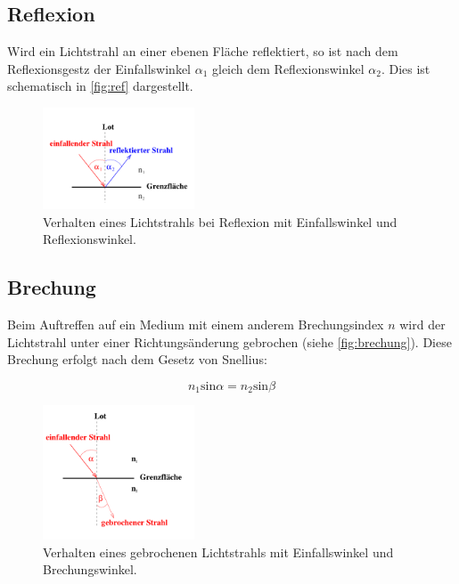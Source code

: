     \subsection{Reflexion}

        \noindent Wird ein Lichtstrahl an einer ebenen Fläche reflektiert, so ist nach dem Reflexionsgestz der Einfallswinkel $\alpha_1$ gleich dem
        Reflexionswinkel $\alpha_2$. Dies ist schematisch in \autoref{fig:ref} dargestellt.

        \begin{figure}[H]
            \centering
            \includegraphics[width=0.4\textwidth]{images/pic2.PNG}
            \caption{Verhalten eines Lichtstrahls bei Reflexion mit Einfallswinkel und Reflexionswinkel. \cite{400}}
            \label{fig:ref}
        \end{figure}

    \subsection{Brechung}

        \noindent Beim Auftreffen auf ein Medium mit einem anderem Brechungsindex $n$ wird der Lichtstrahl unter einer Richtungsänderung gebrochen (siehe \autoref{fig:brechung}). Diese Brechung erfolgt nach dem Gesetz von Snellius:

        \begin{equation}
            n_1 \text{sin} \alpha = n_2 \text{sin} \beta
        \end{equation}

        \begin{figure}[H]
            \centering
            \includegraphics[width=0.4\textwidth]{images/pic3.PNG}
            \caption{Verhalten eines gebrochenen Lichtstrahls mit Einfallswinkel und Brechungswinkel. \cite{400}}
           \label{fig:brechung}
        \end{figure}


